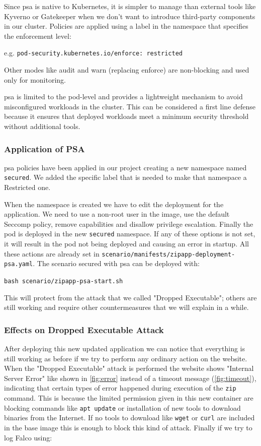 Since \ac{psa} is native to Kubernetes, it is simpler to manage than external tools like Kyverno or Gatekeeper when we don't want to introduce third-party components in our cluster. Policies are applied using a label in the namespace that specifies the enforcement level:

e.g. \texttt{pod-security.kubernetes.io/enforce: restricted}

\noindent Other modes like audit and warn (replacing enforce) are non-blocking and used only for monitoring.

\Ac{psa} is limited to the pod-level and provides a lightweight mechanism to avoid misconfigured workloads in the cluster. This can be considered a first line defense because it ensures that deployed workloads meet a minimum security threshold without additional tools.


\subsubsection{Application of PSA}
\Ac{psa} policies have been applied in our project creating a new namespace named \texttt{secured}. We added the specific label that is needed to make that namespace a Restricted one.

When the namespace is created we have to edit the deployment for the application. We need to use a non-root user in the image, use the default Seccomp policy, remove capabilities and disallow privilege escalation. Finally the pod is deployed in the new \texttt{secured} namespace. If any of these options is not set, it will result in the pod not being deployed and causing an error in startup. All these actions are already set in \texttt{scenario/manifests/zipapp-deployment-psa.yaml}. The scenario secured with \ac{psa} can be deployed with:

\texttt{bash scenario/zipapp-psa-start.sh}

\noindent This will protect from the attack that we called "Dropped Executable"; others are still working and require other countermeasures that we will explain in a while.


\subsubsection{Effects on Dropped Executable Attack}
After deploying this new updated application we can notice that everything is still working as before if we try to perform any ordinary action on the website. When the "Dropped Executable" attack is performed the website shows "Internal Server Error" like shown in \autoref{fig:error} instead of a timeout message (\autoref{fig:timeout}), indicating that certain types of error happened during execution of the \texttt{zip} command. This is because the limited permission given in this new container are blocking commands like \texttt{apt update} or installation of new tools to download binaries from the Internet. If no tools to download like \texttt{wget} or \texttt{curl} are included in the base image this is enough to block this kind of attack. Finally if we try to log Falco using:

